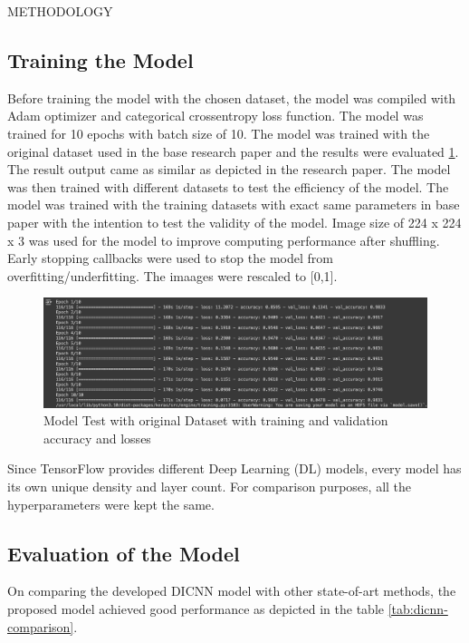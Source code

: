 \begin{section}[]{\uppercase{Methodology}}
\subsection{Training the Model}
Before training the model with the chosen dataset, the model was compiled with Adam optimizer and categorical crossentropy loss function. The model was trained for 10 epochs with batch size of 10. The model was trained with the original dataset used in the base research paper and the results were evaluated \ref*{fig:test-model}. The result output came as similar as depicted in the research paper. The model was then trained with different datasets to test the efficiency of the model.
The model was trained with the training datasets with exact same parameters in base paper with the intention to test the validity of the model. Image size of 224 x 224 x 3 was used for the model to improve computing performance after shuffling. Early stopping callbacks were used to stop the model from overfitting/underfitting. The imaages were rescaled to [0,1].

\begin{figure}
    \centering
    \includegraphics[width=\linewidth]{images/test-model.png}
    \caption{Model Test with original Dataset with training and validation accuracy and losses}
    \label{fig:test-model}
 \end{figure}

Since TensorFlow provides different Deep Learning (DL) models, every model has its own unique
density and layer count. For comparison purposes, all the hyperparameters were kept the same. 

\subsection{Evaluation of the Model}
On comparing the developed DICNN model with other state-of-art methods, the proposed model achieved good performance as depicted in the table \ref{tab:dicnn-comparison}.


\end{section}
